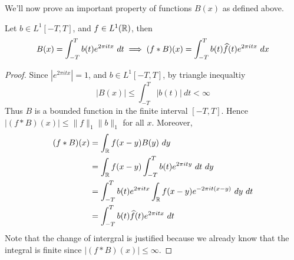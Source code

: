 We'll now prove an important property of functions $B(x)$ as defined above. 

\begin{proposition}
  \label{prop:property_of_analogue_of_trigonometric_functions}
  Let $b \in L^1[-T, T]$, and $f \in L^1(\mathbb R)$, then $$B(x) = \int_{-T}^T b(t)e^{2\pi itx} \ dt \implies (f*B)(x) = \int_{-T}^T b(t) \widehat{f}(t)e^{2\pi itx} \ dx$$
\end{proposition}
\begin{proof}
  Since $|e^{2 \pi itx}| = 1$, and $b \in L^1[-T, T]$, by triangle inequaltiy $$|B(x)| \le \int_{-T}^T |b(t)| \ dt < \infty$$
  Thus $B$ is a bounded function in the finite interval $[-T, T]$. Hence $|(f*B)(x)| \le \|f\|_1 \|b\|_1$ for all $x$. Moreover, 
  \begin{align}
    (f*B)(x) &= \int_\mathbb R f(x-y)B(y) \ dy \\
    &= \int_\mathbb R f(x-y) \int_{-T}^T b(t)e^{2 \pi ity} \ dt \ dy \\
    &= \int_{-T}^{T}b(t) e^{2 \pi itx}\int_\mathbb R f(x-y) e^{-2 \pi it(x-y)} \ dy \ dt \\
    &= \int_{-T}^T b(t)\widehat{f}(t)e^{2\pi itx} \ dt
  \end{align}
  Note that the change of intergral is justified because we already know that the integral is finite since $|(f*B)(x)| \le \infty$.
\end{proof}

